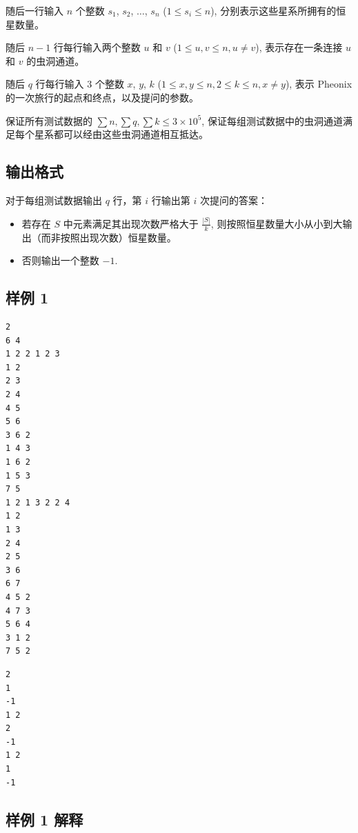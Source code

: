 随后一行输入 $n$ 个整数 $s_1$, $s_2$, $\ldots$, $s_n$ ($1 \le s_i \le n$), 分别表示这些星系所拥有的恒星数量。

随后 $n - 1$ 行每行输入两个整数 $u$ 和 $v$ ($1 \le u, v \le n, u \ne v$), 表示存在一条连接 $u$ 和 $v$ 的虫洞通道。

随后 $q$ 行每行输入 $3$ 个整数 $x$, $y$, $k$ ($1 \le x, y \le n, 2 \le k \le n, x \ne y$), 表示 Pheonix 的一次旅行的起点和终点，以及提问的参数。

保证所有测试数据的 $\sum n, \sum q, \sum k \le 3 \times 10^5$, 保证每组测试数据中的虫洞通道满足每个星系都可以经由这些虫洞通道相互抵达。

\subsection{输出格式}

对于每组测试数据输出 $q$ 行，第 $i$ 行输出第 $i$ 次提问的答案：
\begin{itemize}
	\item 若存在 $S$ 中元素满足其出现次数严格大于 $\frac{|S|}{k}$, 则按照恒星数量大小从小到大输出（而非按照出现次数）恒星数量。
	\item 否则输出一个整数 $-1$.
\end{itemize}

\subsection{样例 1}

\begin{minipage}{\linewidth}
	\begin{minipage}[t]{0.49\linewidth}
		\begin{lstlisting}[title=\texttt{standard input}]
2
6 4
1 2 2 1 2 3
1 2
2 3
2 4
4 5
5 6
3 6 2
1 4 3
1 6 2
1 5 3
7 5
1 2 1 3 2 2 4
1 2
1 3
2 4
2 5
3 6
6 7
4 5 2
4 7 3
5 6 4
3 1 2
7 5 2
\end{lstlisting}
	\end{minipage}
	\begin{minipage}[t]{0.49\linewidth}
		\begin{lstlisting}[title=\texttt{standard output}]
2
1
-1
1 2
2
-1
1 2
1
-1
\end{lstlisting}
	\end{minipage}
\end{minipage}


\subsection{样例 1 解释}


